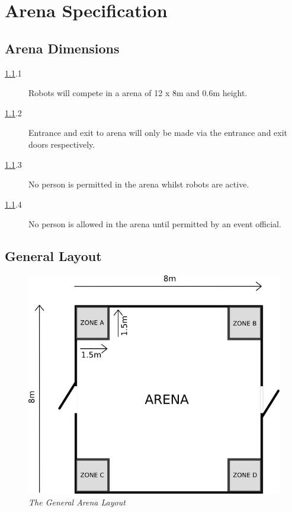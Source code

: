 \section {Arena Specification}

\subsection {Arena Dimensions}
\label{arena}

\begin {description}
\item [\ref{arena}.1] Robots will compete in a arena of 12 x 8m and 0.6m height.
\item [\ref{arena}.2] Entrance and exit to arena will only be made via the entrance and exit doors respectively.
\item [\ref{arena}.3] No person is permitted in the arena whilst robots are active.
\item [\ref{arena}.4] No person is allowed in the arena until permitted by an event official.
\end {description}

\subsection {General Layout}
\label{arenagenlay}

\begin {figure}[h]
\begin {center}
\includegraphics[keepaspectratio, scale =0.5]{../arena/arenadim.png}
\caption{\small{\emph{The General Arena Layout}}}
\label {fig:arena}
\end {center}
\end {figure}

